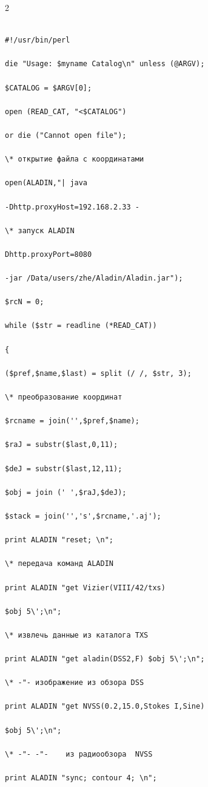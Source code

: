 \begin{multicols}{2}



\noindent

{\small

\begin{verbatim}

#!/usr/bin/perl

die "Usage: $myname Catalog\n" unless (@ARGV);

$CATALOG = $ARGV[0];

open (READ_CAT, "<$CATALOG") 

or die ("Cannot open file"); 

\* открытие файла с координатами

open(ALADIN,"| java 

-Dhttp.proxyHost=192.168.2.33 -       

\* запуск ALADIN

Dhttp.proxyPort=8080 

-jar /Data/users/zhe/Aladin/Aladin.jar");

$rcN = 0;

while ($str = readline (*READ_CAT))

{

($pref,$name,$last) = split (/ /, $str, 3);               

\* преобразование координат

$rcname = join('',$pref,$name);

$raJ = substr($last,0,11);

$deJ = substr($last,12,11);

$obj = join (' ',$raJ,$deJ);

$stack = join('','s',$rcname,'.aj');

print ALADIN "reset; \n";                                 

\* передача команд ALADIN

print ALADIN "get Vizier(VIII/42/txs) 

$obj 5\';\n";       

\* извлечь данные из каталога TXS

print ALADIN "get aladin(DSS2,F) $obj 5\';\n";            

\* -"- изображение из обзора DSS

print ALADIN "get NVSS(0.2,15.0,Stokes I,Sine) 

$obj 5\';\n"; 

\* -"- -"-    из радиообзора  NVSS

print ALADIN "sync; contour 4; \n";                       


\end{verbatim}}
\end{multicols}
